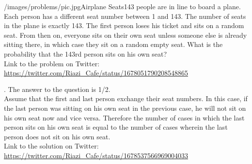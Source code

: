 \begin{problem}{/images/problems/pic.jpg}{Airplane Seats}143 people are in line to board a plane. Each person has a different seat number between 1 and 143. The number of seats in the plane is exactly 143. The first person loses his ticket and sits on a random seat. From then on, everyone sits on their own seat unless someone else is already sitting there, in which case they sit on a random empty seat. What is the probability that the 143rd person  sits on his own seat?\\[0.2cm]

Link to the problem on Twitter:  \url{https://twitter.com/Riazi_Cafe/status/1678051790208548865}\end{problem}
\begin{solution}.
The answer to the question is 1/2.\\[0.2cm]

Assume that the first and last person exchange their seat numbers. In this case, if the last person was sitting on his own seat in the previous case, he will not sit on his own seat now and vice versa. Therefore the number of cases in which the last person sits on his own seat is equal to the number of cases wherein the last person does not sit on his own seat.\\[0.2cm]

Link to the solution on Twitter:  \url{https://twitter.com/Riazi_Cafe/status/1678537566969004033}\end{solution}
